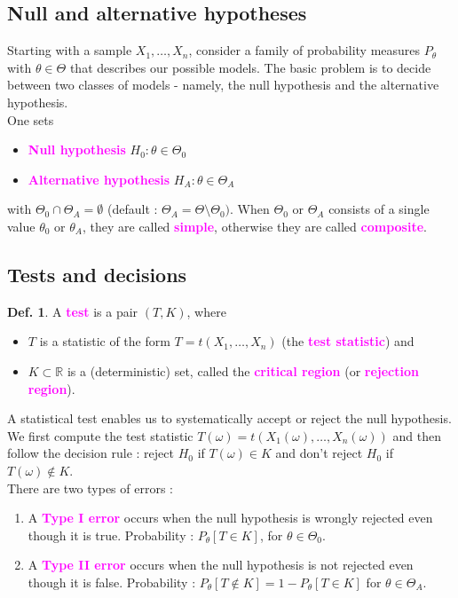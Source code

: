 \documentclass[8pt,a4paper,landscape]{article}
\theoremstyle{definition}
\newtheorem{definition}{Def.}[section]
\theoremstyle{example}
\theoremstyle{intuition}
\theoremstyle{definition}
\newcommand{\mydef}[1]{\textcolor{magenta}{\textbf{#1}}}
\begin{document}
\begin{multicols}{3}
			\subsection{Null and alternative hypotheses}
				Starting with a sample $X_1, \ldots, X_n$, consider a family of probability measures $P_\theta$ with $\theta \in \Theta$ that describes our possible models. The basic problem is to decide between two classes of models - namely, the null hypothesis and the alternative hypothesis. \\
				One sets 
				\begin{itemize}
					\item \mydef{Null hypothesis} $H_0 : \theta \in \Theta_0$
					\item \mydef{Alternative hypothesis} $H_A : \theta \in \Theta_A$
				\end{itemize}
				with $\Theta_0 \cap \Theta_A = \emptyset$ (default : $\Theta_A = \Theta \setminus \Theta_0)$. When $\Theta_0$ or $\Theta_A$ consists of a single value $\theta_0$ or $\theta_A$, they are called \mydef{simple}, otherwise they are called \mydef{composite}.



			\subsection{Tests and decisions}
				\begin{definition}
					A \mydef{test} is a pair $(T, K)$, where 
					\begin{itemize}
						\item $T$ is a statistic of the form $T = t(X_1, \ldots, X_n)$ (the \mydef{test statistic}) and 
						\item $K \subset \mathbb{R}$ is a (deterministic) set, called the \mydef{critical region} (or \mydef{rejection region}).
					\end{itemize}
				\end{definition}

				A statistical test enables us to systematically accept or reject the null hypothesis. We first compute the test statistic $T(\omega) = t(X_1(\omega), \ldots, X_n(\omega))$ and then follow the decision rule : reject $H_0$ if $T(\omega) \in K$ and don't reject $H_0$ if $T(\omega) \notin K$. \\

				There are two types of errors :
				\begin{enumerate}
					\item A \mydef{Type I error} occurs when the null hypothesis is wrongly rejected even though it is true. Probability : $P_\theta[T \in K]$, for $\theta \in \Theta_0$.
					\item A \mydef{Type II error} occurs when the null hypothesis is not rejected even though it is false. Probability : $P_\theta[T \notin K] = 1 - P_\theta[T \in K]$ for $\theta \in \Theta_A$.
				\end{enumerate}



\end{multicols}
\end{document}
